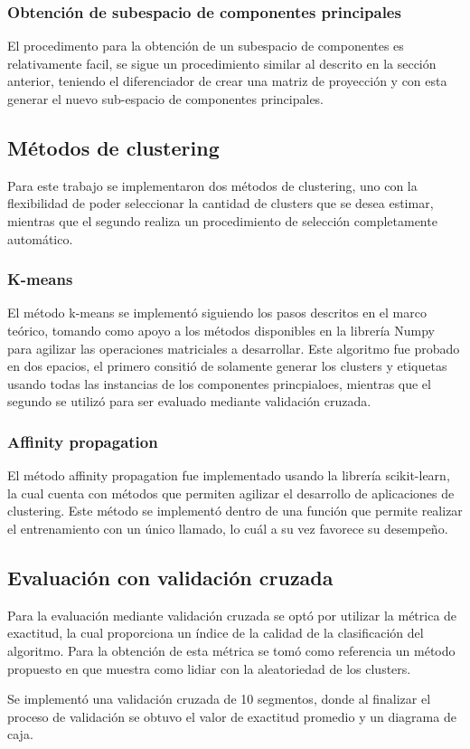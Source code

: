 \subsubsection{Obtención de subespacio de componentes principales}
El procedimento para la obtención de un subespacio de componentes es relativamente facil, se sigue un procedimiento similar al descrito en la sección anterior, teniendo el diferenciador de crear una matriz de proyección y con esta generar el nuevo sub-espacio de componentes principales.

\subsection{Métodos de clustering}
Para este trabajo se implementaron dos métodos de clustering, uno con la flexibilidad de poder seleccionar la cantidad de clusters que se desea estimar, mientras que el segundo realiza un procedimiento de selección completamente automático.

\subsubsection{K-means}
El método k-means se implementó siguiendo los pasos descritos en el marco teórico, tomando como apoyo a los métodos disponibles en la librería Numpy para agilizar las operaciones matriciales a desarrollar. Este algoritmo fue probado en dos epacios, el primero consitió de solamente generar los clusters y etiquetas usando todas las instancias de los componentes princpialoes, mientras que el segundo se utilizó para ser evaluado mediante validación cruzada.

\subsubsection{Affinity propagation}
El método affinity propagation fue implementado usando la librería scikit-learn, la cual cuenta con métodos que permiten agilizar el desarrollo de aplicaciones de clustering. Este método se implementó dentro de una función que permite realizar el entrenamiento con un único llamado, lo cuál a su vez favorece su desempeño. 


\subsection{Evaluación con validación cruzada}
Para la evaluación mediante validación cruzada se optó por utilizar la métrica de exactitud, la cual proporciona un índice de la calidad de la clasificación del algoritmo. Para la obtención de esta métrica se tomó como referencia un método propuesto en \cite{Aceves2021} que muestra como lidiar con la aleatoriedad de los clusters.

Se implementó una validación cruzada de 10 segmentos, donde al finalizar el proceso de validación se obtuvo el valor de exactitud promedio y un diagrama de caja.
